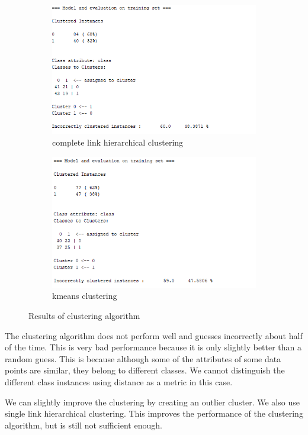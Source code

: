 \documentclass[letterpaper,12pt]{article}
\begin{document}
\begin{figure}[H]
\begin{subfigure}{.5\textwidth}
  \centering
  \includegraphics[width=.8\linewidth]{hierarch_complete_link_results}  
  \caption{complete link hierarchical clustering}
  \label{fig:sub-first_1}
\end{subfigure}
\begin{subfigure}{.5\textwidth}
  \centering
  \includegraphics[width=.8\linewidth]{hierarch_kmeans_results}  
  \caption{kmeans clustering}
  \label{fig:sub-second_1}
\end{subfigure}
\caption{Results of clustering algorithm}
\label{fig:fig_1}
\end{figure}

The clustering algorithm does not perform well and guesses incorrectly about half of the time. This is very bad performance because it is only slightly better than a random guess. This is because although some of the attributes of some data points are similar, they belong to different classes. We cannot distinguish the different class instances using distance as a metric in this case.

We can slightly improve the clustering by creating an outlier cluster. We also use single link hierarchical clustering. This improves the performance of the clustering algorithm, but is still not sufficient enough.
\end{document}
